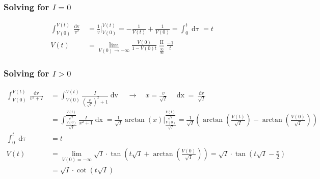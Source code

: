 \subsubsection{Solving for \texorpdfstring{$I = 0$}{TEXT}}
\begin{align*}
\int_{V(0)}^{V(t)} \frac{\mathop{dv}}{v^2} &= \frac{1}{v}\Big\rvert_{V(0)}^{V(t)} = - \frac{1}{V(t)} + \frac{1}{V(0)} = \int_0^t \mathop{d\tau} = t \\
V(t) &= \lim_{V(0) \rightarrow - \infty} \frac{V(0)}{1-V(0)t} \underset{\frac{\infty}{\infty}}{\overset{\mathrm{H}}{=}} \frac{-1}{t}
\end{align*}


\subsubsection{Solving for \texorpdfstring{$I > 0$}{TEXT}}
\begin{align*}
\int_{V(0)}^{V(t)} \frac{\mathop{dv}}{v^2 + I} &= \int_{V(0)}^{V(t)} \frac{I}{\left(\frac{v}{\sqrt{I}}\right)^2 + 1} \mathop{dv}
\quad \longrightarrow \quad x = \frac{v}{\sqrt{I}} \quad \mathop{dx} = \frac{\mathop{dv}}{\sqrt{I}} \\
&= \int_{\frac{V(0)}{\sqrt{I}}}^{\frac{V(t)}{\sqrt{I}}} \frac{I}{x^2 + 1} \mathop{dx}= \frac{1}{\sqrt{I}} \arctan(x) \Big \rvert_{\frac{V(0)}{\sqrt{I}}}^{\frac{V(t)}{\sqrt{I}}} 
= \frac{1}{\sqrt{I}} \left( \arctan \left( \frac{V(t)}{\sqrt{I}} \right) - \arctan \left( \frac{V(0)}{\sqrt{I}} \right) \right)\\
\int_0^t \mathop{d\tau} &= t \\
V(t) &= \lim_{V(0) = -\infty} \sqrt{I} \cdot \tan \left( t \sqrt{I} + \arctan \left( \frac{V(0)}{\sqrt{I}} \right) \right) = \sqrt{I} \cdot \tan \left( t \sqrt{I} - \frac{\pi}{2} \right) \\
&=  \sqrt{I} \cdot \cot \left( t \sqrt{I} \right) 
\end{align*}

